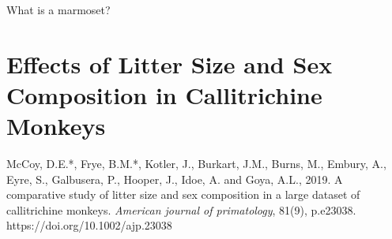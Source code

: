 \begin{savequote}[65mm]
What is a marmoset?
\end{savequote}

\chapter{Effects of Litter Size and Sex Composition in Callitrichine Monkeys}

\newthought{\textcolor{SchoolColor}{Reprinted from:}}
McCoy, D.E.*, Frye, B.M.*, Kotler, J., Burkart, J.M., Burns, M., Embury, A., Eyre, S., Galbusera, P., Hooper, J., Idoe, A. and Goya, A.L., 2019. A comparative study of litter size and sex composition in a large dataset of callitrichine monkeys. \emph{American journal of primatology}, 81(9), p.e23038.
\\
\newthought{\textcolor{SchoolColor}{Article and supplement available at:}} https://doi.org/10.1002/ajp.23038